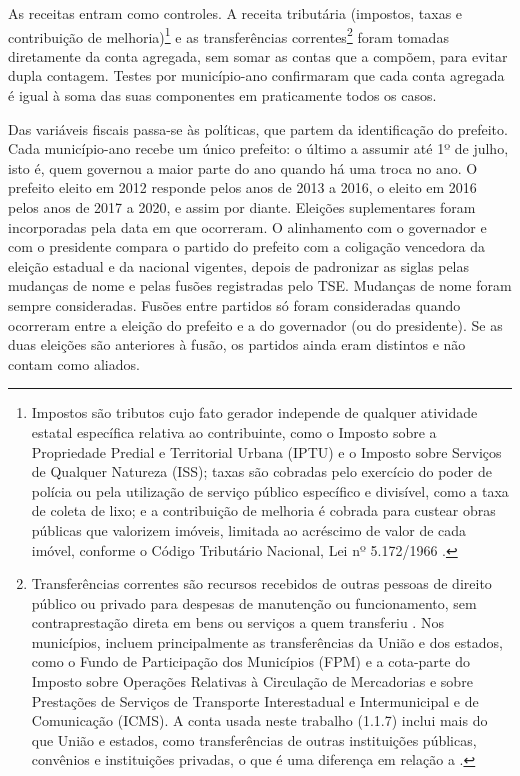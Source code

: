 As receitas entram como controles. A receita tributária (impostos, taxas e contribuição de melhoria)\footnote{Impostos são tributos cujo fato gerador independe de qualquer atividade estatal específica relativa ao contribuinte, como o Imposto sobre a Propriedade Predial e Territorial Urbana (IPTU) e o Imposto sobre Serviços de Qualquer Natureza (ISS); taxas são cobradas pelo exercício do poder de polícia ou pela utilização de serviço público específico e divisível, como a taxa de coleta de lixo; e a contribuição de melhoria é cobrada para custear obras públicas que valorizem imóveis, limitada ao acréscimo de valor de cada imóvel, conforme o Código Tributário Nacional, Lei nº 5.172/1966 \parencite[arts.~16, 77 e 81]{ctn1966}.} e as transferências correntes\footnote{Transferências correntes são recursos recebidos de outras pessoas de direito público ou privado para despesas de manutenção ou funcionamento, sem contraprestação direta em bens ou serviços a quem transferiu \parencite[p.~49]{mcasp2024}. Nos municípios, incluem principalmente as transferências da União e dos estados, como o Fundo de Participação dos Municípios (FPM) e a cota-parte do Imposto sobre Operações Relativas à Circulação de Mercadorias e sobre Prestações de Serviços de Transporte Interestadual e Intermunicipal e de Comunicação (ICMS). A conta usada neste trabalho (1.1.7) inclui mais do que União e estados, como transferências de outras instituições públicas, convênios e instituições privadas, o que é uma diferença em relação a \textcite{sakurai2009}.} foram tomadas diretamente da conta agregada, sem somar as contas que a compõem, para evitar dupla contagem. Testes por município-ano confirmaram que cada conta agregada é igual à soma das suas componentes em praticamente todos os casos.

Das variáveis fiscais passa-se às políticas, que partem da identificação do prefeito. Cada município-ano recebe um único prefeito: o último a assumir até 1º de julho, isto é, quem governou a maior parte do ano quando há uma troca no ano. O prefeito eleito em 2012 responde pelos anos de 2013 a 2016, o eleito em 2016 pelos anos de 2017 a 2020, e assim por diante. Eleições suplementares foram incorporadas pela data em que ocorreram. O alinhamento com o governador e com o presidente compara o partido do prefeito com a coligação vencedora da eleição estadual e da nacional vigentes, depois de padronizar as siglas pelas mudanças de nome e pelas fusões registradas pelo TSE. Mudanças de nome foram sempre consideradas. Fusões entre partidos só foram consideradas quando ocorreram entre a eleição do prefeito e a do governador (ou do presidente). Se as duas eleições são anteriores à fusão, os partidos ainda eram distintos e não contam como aliados.

